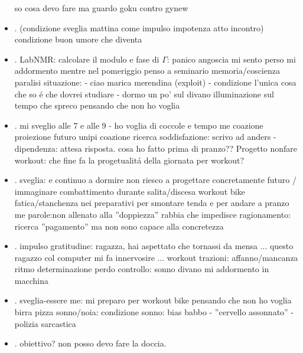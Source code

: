 \begin{itemize}
so cosa devo fare ma guardo goku contro gynew
\item {}.
(condizione sveglia mattina come impulso impotenza atto incontro)
condizione buon umore che diventa 
\item {}.
LabNMR: calcolare il modulo e fase di $\Gamma$: panico angoscia mi sento perso
mi addormento mentre nel pomeriggio penso a seminario
memoria/coscienza paralisi situazione: -
ciao marica merendina (exploit) - condizione l'unica cosa che so \'e che dovrei studiare - dormo un po' sul divano
illuminazione sul tempo che spreco pensando che non ho voglia
\item {}.
mi sveglio alle 7 e alle 9 - ho voglia di coccole e tempo me coazione proiezione futuro unipi
coazione ricerca soddisfazione: scrivo ad anders - dipendenza: attesa risposta.
cosa ho fatto prima di pranzo?? 
Progetto nonfare workout: che fine fa la progetualit\'a della giornata per workout? 
\item {}.
sveglia:  e continuo a dormire
non riesco a progettare concretamente futuro / immaginare combattimento durante salita/discesa workout bike
fatica/stanchenza nei preparativi per smontare tenda e per andare a pranzo
me parole:non allenato alla ''doppiezza''
rabbia che impedisce ragionamento: ricerca ''pagamento'' ma non sono capace alla concretezza
\item {}.
impulso gratitudine: ragazza, hai aspettato che tornassi da mensa ...
questo ragazzo col computer mi fa innervosire ...
workout trazioni: affanno/mancanza ritmo determinazione
perdo controllo: sonno divano
mi addormento in macchina
\item {}.
sveglia-essere me: 
mi preparo per workout bike pensando che non ho voglia
birra pizza sonno/noia: 
condizione sonno: bias babbo - ''cervello assonnato'' - polizia sarcastica
\item {}.
obiettivo? non posso devo fare la doccia.

\end{itemize}
